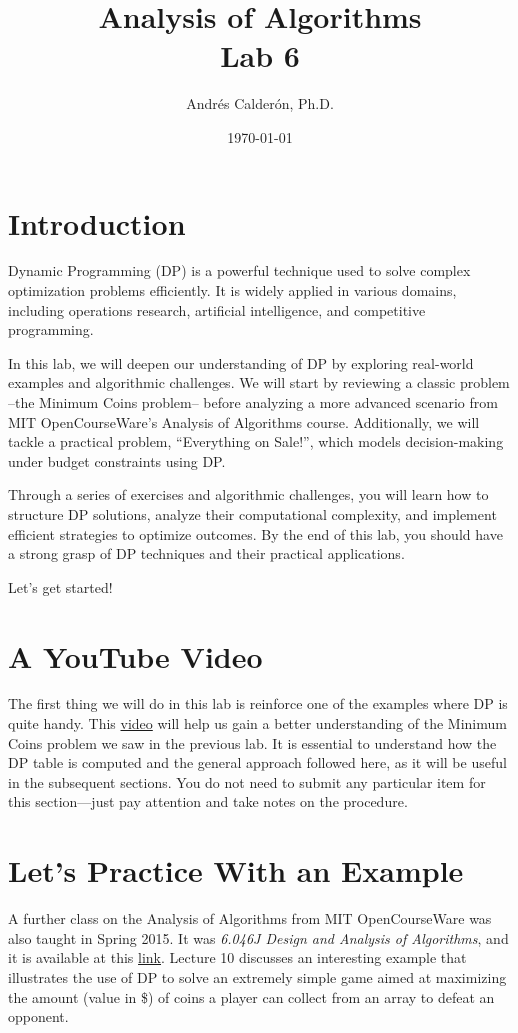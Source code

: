 \documentclass[11pt]{article}
\title{Analysis of Algorithms \\ Lab 6}
\author{Andrés Calderón, Ph.D.}
\date{\today}
\begin{document}
\maketitle

\section{Introduction}
Dynamic Programming (DP) is a powerful technique used to solve complex optimization problems efficiently. It is widely applied in various domains, including operations research, artificial intelligence, and competitive programming.

In this lab, we will deepen our understanding of DP by exploring real-world examples and algorithmic challenges. We will start by reviewing a classic problem --the Minimum Coins problem-- before analyzing a more advanced scenario from MIT OpenCourseWare’s Analysis of Algorithms course. Additionally, we will tackle a practical problem, ``Everything on Sale!'', which models decision-making under budget constraints using DP.

Through a series of exercises and algorithmic challenges, you will learn how to structure DP solutions, analyze their computational complexity, and implement efficient strategies to optimize outcomes. By the end of this lab, you should have a strong grasp of DP techniques and their practical applications.

Let's get started!

\section{A YouTube Video}
The first thing we will do in this lab is reinforce one of the examples where DP is quite handy. This \href{https://youtu.be/Sf4OKx1Wz9w?si=sq4UsK_EzD2tZGkx}{video} will help us gain a better understanding of the Minimum Coins problem we saw in the previous lab. It is essential to understand how the DP table is computed and the general approach followed here, as it will be useful in the subsequent sections. You do not need to submit any particular item for this section—just pay attention and take notes on the procedure.

\section{Let's Practice With an Example}
A further class on the Analysis of Algorithms from MIT OpenCourseWare was also taught in Spring 2015. It was \textit{6.046J Design and Analysis of Algorithms}, and it is available at this \href{https://ocw.mit.edu/courses/6-046j-design-and-analysis-of-algorithms-spring-2015/}{link}. Lecture 10 discusses an interesting example that illustrates the use of DP to solve an extremely simple game aimed at maximizing the amount (value in \$) of coins a player can collect from an array to defeat an opponent.
\end{document}
